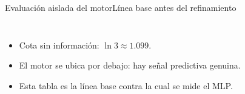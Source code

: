\documentclass[aspectratio=169,11pt]{beamer}
\begin{document}
\begin{frame}{Evaluaci\'on aislada del motor}{L\'inea base antes del refinamiento}
	\begin{columns}[T,onlytextwidth]
		\centering
		\small
		\renewcommand{\arraystretch}{1.4}
		\par\vskip 2mm
		\small
		\begin{itemize}
			\item Cota sin informaci\'on: $\ln 3 \approx 1{.}099$.
			\item El motor se ubica por debajo: hay se\~nal predictiva genuina.
			\item Esta tabla es la l\'inea base contra la cual se mide el MLP.
		\end{itemize}
	\end{columns}
\end{frame}
\end{document}
